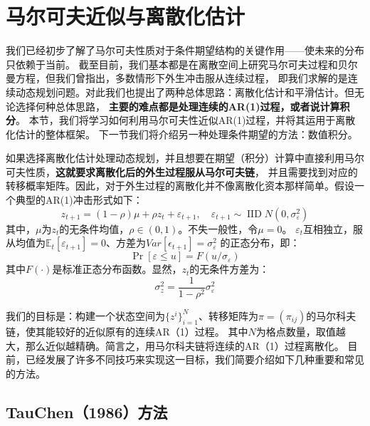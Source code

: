 
\section{马尔可夫近似与离散化估计}    \label{sec-markov-approximation}

我们已经初步了解了马尔可夫性质对于条件期望结构的关键作用——使未来的分布只依赖于当前。
截至目前，我们基本都是在离散空间上研究马尔可夫过程和贝尔曼方程，但我们曾指出，多数情形下外生冲击服从连续过程，
即我们求解的是连续动态规划问题。对此我们也提出了两种总体思路：离散化估计和平滑估计。但无论选择何种总体思路，
\textbf{主要的难点都是处理连续的AR(1)过程，或者说计算积分}。
本节，我们将学习如何利用马尔可夫性近似AR(1)过程，并将其运用于离散化估计的整体框架。
下一节我们将介绍另一种处理条件期望的方法：数值积分。

如果选择离散化估计处理动态规划，并且想要在期望（积分）计算中直接利用马尔可夫性质，\textbf{这就要求离散化后的外生过程服从马尔可夫链}，
并且需要找到对应的转移概率矩阵。因此，对于外生过程的离散化并不像离散化资本那样简单。假设一个典型的AR(1)冲击形式如下：
\begin{equation}    \label{eq-z-ar1}
    z_{t+1}=(1-\rho) \mu+\rho z_t + \varepsilon_{t+1}, \quad 
        \varepsilon_{t+1} \sim \operatorname{IID} N(0,\sigma_{\varepsilon}^2)
\end{equation}
其中，$\mu$为$z_t$的无条件均值，$\rho\in(0,1)$。不失一般性，令$\mu=0$。
$\varepsilon_t$互相独立，服从均值为$\mathbb{E}_t[\varepsilon_{t+1}]=0$、方差为$Var[\epsilon_{t+1}] = \sigma_{\varepsilon}^2$
的正态分布，即：
\begin{equation*}
    \operatorname{Pr}[\varepsilon\leq u] = F(u/\sigma_{\varepsilon})
\end{equation*}
其中$F(\cdot)$是标准正态分布函数。显然，$z_t$的无条件方差为：
\begin{equation*}
    \sigma_z^2 = \frac{1}{1-\rho^2}\sigma_{\varepsilon}^2
\end{equation*}

我们的目标是：构建一个状态空间为$\{z^i\}_{i=1}^N$、转移矩阵为$\pi=(\pi_{ij})$的马尔科夫链，使其能较好的近似原有的连续AR（1）过程。
其中$N$为格点数量，取值越大，那么近似越精确。简言之，用马尔科夫链将连续的AR（1）过程离散化。
目前，已经发展了许多不同技巧来实现这一目标，我们简要介绍如下几种重要和常见的方法。


\subsection{TauChen（1986）方法}

